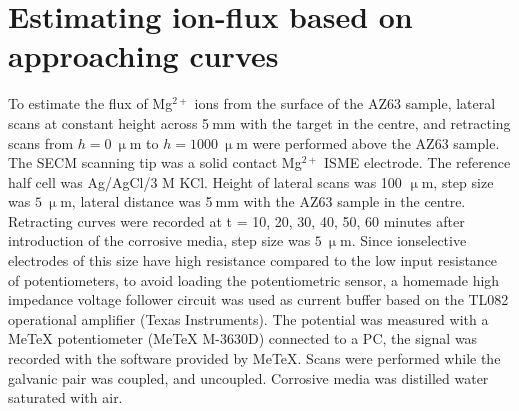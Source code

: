 	\section{Estimating ion-flux based on approaching curves}
To estimate the flux of Mg$^{2+}$ ions from the surface of the AZ63 sample, lateral scans at constant height across 5$~$mm with the target in the centre, and retracting scans from $h=0~\upmu$m to $h=1000~\upmu$m were performed above the AZ63 sample.
The SECM scanning tip was a solid contact Mg$^{2+}$ ISME electrode.
The reference half cell was Ag/AgCl/3 M KCl.
Height of lateral scans was 100 $\upmu$m, step size was $5~\upmu$m, lateral distance was 5$~$mm with the AZ63 sample in the centre.
Retracting curves were recorded at t = 10, 20, 30, 40, 50, 60 minutes after introduction of the corrosive media, step size was $5~\upmu$m.
Since ionselective electrodes of this size have high resistance compared to the low input resistance of potentiometers, to avoid loading the potentiometric sensor, a homemade high impedance voltage follower circuit was used as current buffer based on the TL082 operational amplifier (Texas Instruments).
The potential was measured with a MeTeX potentiometer (MeTeX M-3630D) connected to a PC, the signal was recorded with the software provided by MeTeX.
Scans were performed while the galvanic pair was coupled, and uncoupled.
Corrosive media was distilled water saturated with air.
